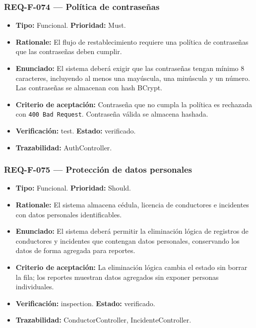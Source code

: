 \documentclass[12pt,a4paper]{article}
\begin{document}
\subsubsection{REQ-F-074 --- Política de contraseñas}
\begin{itemize}
  \item \textbf{Tipo:} Funcional. \textbf{Prioridad:} Must.
  \item \textbf{Rationale:} El flujo de restablecimiento requiere una política de contraseñas que las contraseñas deben cumplir.
  \item \textbf{Enunciado:} El sistema deberá exigir que las contraseñas tengan mínimo 8 caracteres, incluyendo al menos una mayúscula, una minúscula y un número. Las contraseñas se almacenan con hash BCrypt.
  \item \textbf{Criterio de aceptación:} Contraseña que no cumpla la política es rechazada con \texttt{400 Bad Request}. Contraseña válida se almacena hashada.
  \item \textbf{Verificación:} test. \textbf{Estado:} verificado.
  \item \textbf{Trazabilidad:} AuthController.
\end{itemize}

\subsubsection{REQ-F-075 --- Protección de datos personales}
\begin{itemize}
  \item \textbf{Tipo:} Funcional. \textbf{Prioridad:} Should.
  \item \textbf{Rationale:} El sistema almacena cédula, licencia de conductores e incidentes con datos personales identificables.
  \item \textbf{Enunciado:} El sistema deberá permitir la eliminación lógica de registros de conductores y incidentes que contengan datos personales, conservando los datos de forma agregada para reportes.
  \item \textbf{Criterio de aceptación:} La eliminación lógica cambia el estado sin borrar la fila; los reportes muestran datos agregados sin exponer personas individuales.
  \item \textbf{Verificación:} inspection. \textbf{Estado:} verificado.
  \item \textbf{Trazabilidad:} ConductorController, IncidenteController.
\end{itemize}
\end{document}
